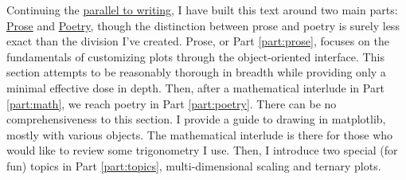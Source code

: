 Continuing the \hyperref[sec:writing]{parallel to writing}, I have built this text around two main parts: \hyperref[part:prose]{Prose} and \hyperref[part:poetry]{Poetry}, though the distinction between prose and poetry is surely less exact than the division I've created. Prose, or Part \ref{part:prose}, focuses on the fundamentals of customizing plots through the object-oriented interface. This section attempts to be reasonably thorough in breadth while providing only a minimal effective dose in depth. Then, after a mathematical interlude in Part \ref{part:math}, we reach poetry in Part \ref{part:poetry}. There can be no comprehensiveness to this section. I provide a guide to drawing in matplotlib, mostly with various  objects. The mathematical interlude is there for those who would like to review some trigonometry I use. Then, I introduce two special (for fun) topics in Part \ref{part:topics}, multi-dimensional scaling and ternary plots. 

